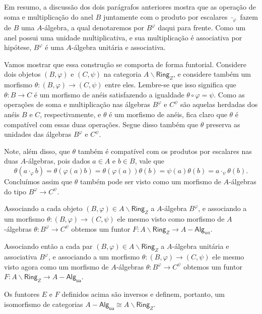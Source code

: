 Em resumo, a discussão dos dois parágrafos anteriores mostra que as operação de soma e multiplicação do anel $B$ juntamente com o produto por escalares $\cdot_{\varphi}$ fazem de $B$ uma $A$-álgebra, a qual denotaremos por $B^{\varphi}$ daqui para frente.
Como um anel possui uma unidade multiplicativa, e sua multiplicação é associativa por hipótese, $B^{\varphi}$ é uma $A$-álgebra unitária e associativa.

Vamos mostrar que essa construção se comporta de forma funtorial.
Considere dois objetos $(B,\varphi)$ e $(C,\psi)$ na categoria $A \backslash \mathsf{Ring}_{Z}$, e considere também um morfismo $\theta: (B,\varphi) \to (C,\psi)$ entre eles.
Lembre-se que isso significa que $\theta: B \to C$ é um morfismo de anéis satisfazendo a igualdade $\theta \circ \varphi = \psi$.
Como as operações de soma e multiplicação nas álgebras $B^{\varphi}$ e $C^{\psi}$ são aquelas herdadas dos anéis $B$ e $C$, respectivamente, e $\theta$ é um morfismo de anéis, fica claro que $\theta$ é compatível com essas duas operações.
Segue disso também que $\theta$ preserva as unidades das álgebras $B^{\varphi}$ e $C^{\psi}$.

Note, além disso, que $\theta$ também é compatível com os produtos por escalares nas duas $A$-álgebras, pois dados $a \in A$ e $b \in B$, vale que
\begin{displaymath}
  \theta(a \cdot_{\varphi} b) = \theta(\varphi(a)b) = \theta(\varphi(a))\theta(b) = \psi(a)\theta(b) = a \cdot_{\psi} \theta(b).
\end{displaymath}
Concluímos assim que $\theta$ também pode ser visto como um morfismo de $A$-álgebras do tipo $B^{\varphi} \to C^{\psi}$.

Associando a cada objeto $(B,\varphi) \in A \backslash \mathsf{Ring}_{Z}$ a $A$-álgebra $B^{\varphi}$, e associando a um morfismo $\theta: (B,\varphi) \to (C,\psi)$ ele mesmo visto como morfismo de $A$-álgebras $\theta: B^{\varphi} \to C^{\psi}$ obtemos um funtor $F: A \backslash \mathsf{Ring}_{Z} \to A-\mathsf{Alg}_{ua}$.

Associando então a cada par $(B,\varphi) \in A \backslash \mathsf{Ring}_{Z}$ a $A$-álgebra unitária e associativa $B^{\varphi}$, e associando a um morfismo $\theta: (B,\varphi) \to (C,\psi)$ ele mesmo visto agora como um morfismo de $A$-álgebras $\theta: B^{\varphi} \to C^{\psi}$ obtemos um funtor $F: A \backslash \mathsf{Ring}_{Z} \to A-\mathsf{Alg_{ua}}$.

\begin{teo}\label{eq:equiv_algebras_e_setas_aneis}
  Os funtores $E$ e $F$ definidos acima são inversos e definem, portanto, um isomorfismo de categorias $A-\mathsf{Alg_{ua}} \cong A \backslash \mathsf{Ring}_{Z}$.
\end{teo}

